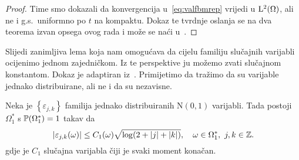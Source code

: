 \documentclass[main.tex]{subfiles}
\begin{document}
\begin{proof}
	Time smo dokazali da konvergencija u~\eqref{eq:valfbmrep} vrijedi u \( \L^2(\Omega) \), ali ne i g.s.\ uniformno po \( t \) na kompaktu. Dokaz te tvrdnje oslanja
	se na dva teorema izvan opsega ovog rada i može se naći u~\cite[tm.~3.15]{ayache}.

\end{proof}

Slijedi zanimljiva lema koja nam
omogućava da cijelu familiju slučajnih varijabli
ocijenimo jednom zajedničkom. Iz te perspektive
ju možemo zvati slučajnom konstantom.
Dokaz je adaptiran iz~\cite[str~459.]{jourfa-ayache}.
Primijetimo da tražimo da su varijable jednako distribuirane,
ali ne i da su nezavisne.

\begin{lema}\label{holpo-lema1}
	Neka je \( \left\{ \varepsilon_{j,k} \right\} \) familija jednako distribuiranih
	\( \mathrm N(0,1) \) varijabli. Tada postoji \( \Omega_1^* \) s \( \P(\Omega_1^*) = 1 \)
	takav da
	\begin{equation}
		\abs{\varepsilon_{j,k}(\omega)} \le C_1(\omega) \sqrt{\log(2 + \abs j + \abs k)}
		,\quad \omega \in \Omega_1^*, \ j,k \in \Z.
	\end{equation}
	gdje je \( C_1  \) slučajna varijabla čiji je svaki moment konačan.
\end{lema}
\end{document}
